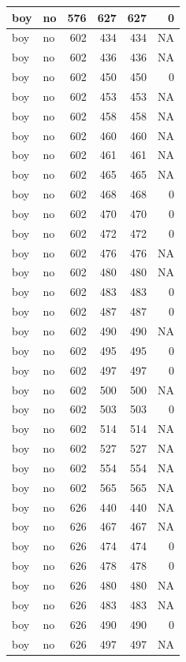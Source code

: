 \documentclass[man]{apa6}
\begin{document}
\begin{tabular}{l|l|r|r|r|r}
\hline
boy & no & 576 & 627 & 627 & 0\\
\hline
boy & no & 602 & 434 & 434 & NA\\
\hline
boy & no & 602 & 436 & 436 & NA\\
\hline
boy & no & 602 & 450 & 450 & 0\\
\hline
boy & no & 602 & 453 & 453 & NA\\
\hline
boy & no & 602 & 458 & 458 & NA\\
\hline
boy & no & 602 & 460 & 460 & NA\\
\hline
boy & no & 602 & 461 & 461 & NA\\
\hline
boy & no & 602 & 465 & 465 & NA\\
\hline
boy & no & 602 & 468 & 468 & 0\\
\hline
boy & no & 602 & 470 & 470 & 0\\
\hline
boy & no & 602 & 472 & 472 & 0\\
\hline
boy & no & 602 & 476 & 476 & NA\\
\hline
boy & no & 602 & 480 & 480 & NA\\
\hline
boy & no & 602 & 483 & 483 & 0\\
\hline
boy & no & 602 & 487 & 487 & 0\\
\hline
boy & no & 602 & 490 & 490 & NA\\
\hline
boy & no & 602 & 495 & 495 & 0\\
\hline
boy & no & 602 & 497 & 497 & 0\\
\hline
boy & no & 602 & 500 & 500 & NA\\
\hline
boy & no & 602 & 503 & 503 & 0\\
\hline
boy & no & 602 & 514 & 514 & NA\\
\hline
boy & no & 602 & 527 & 527 & NA\\
\hline
boy & no & 602 & 554 & 554 & NA\\
\hline
boy & no & 602 & 565 & 565 & NA\\
\hline
boy & no & 626 & 440 & 440 & NA\\
\hline
boy & no & 626 & 467 & 467 & NA\\
\hline
boy & no & 626 & 474 & 474 & 0\\
\hline
boy & no & 626 & 478 & 478 & 0\\
\hline
boy & no & 626 & 480 & 480 & NA\\
\hline
boy & no & 626 & 483 & 483 & NA\\
\hline
boy & no & 626 & 490 & 490 & 0\\
\hline
boy & no & 626 & 497 & 497 & NA\\

\end{tabular}
\end{document}
